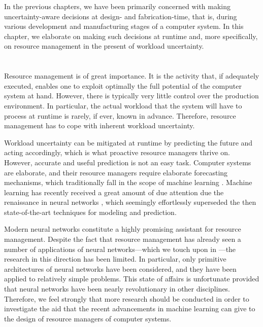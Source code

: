 In the previous chapters, we have been primarily concerned with making
uncertainty-aware decisions at design- and fabrication-time, that is, during
various development and manufacturing stages of a computer system. In this
chapter, we elaborate on making such decisions at runtime and, more
specifically, on resource management in the present of workload uncertainty.

\section{\introductiontitle}

Resource management is of great importance. It is the activity that, if
adequately executed, enables one to exploit optimally the full potential of the
computer system at hand. However, there is typically very little control over
the production environment. In particular, the actual workload that the system
will have to process at runtime is rarely, if ever, known in advance. Therefore,
resource management has to cope with inherent workload uncertainty.

Workload uncertainty can be mitigated at runtime by predicting the future and
acting accordingly, which is what proactive resource managers thrive on.
However, accurate and useful prediction is not an easy task. Computer systems
are elaborate, and their resource managers require elaborate forecasting
mechanisms, which traditionally fall in the scope of machine learning
\cite{hastie2013}. Machine learning has recently received a great amount of due
attention due the renaissance in neural networks \cite{goodfellow2016}, which
seemingly effortlessly superseded the then state-of-the-art techniques for
modeling and prediction.

Modern neural networks constitute a highly promising assistant for resource
management. Despite the fact that resource management has already seen a number
of applications of neural networks---which we touch upon in
---the research in this direction has been limited. In
particular, only primitive architectures of neural networks have been
considered, and they have been applied to relatively simple problems. This state
of affairs is unfortunate provided that neural networks have been nearly
revolutionary in other disciplines. Therefore, we feel strongly that more
research should be conducted in order to investigate the aid that the recent
advancements in machine learning can give to the design of resource managers of
computer systems.


